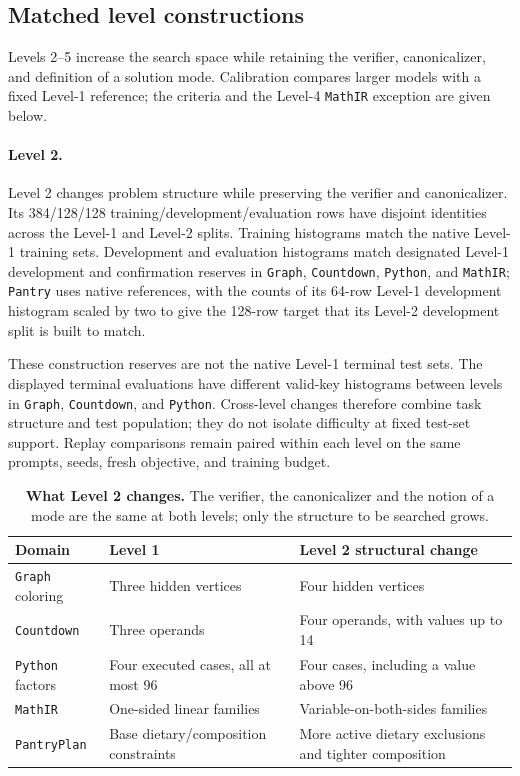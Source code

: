 \documentclass{article}
\newcommand{\1}{\mathbf 1}
\theoremstyle{remark}
\theoremstyle{definition}
\theoremstyle{plain}
\begin{document}
\subsection{Matched level constructions}
\label{app:data-levels}

Levels 2--5 increase the search space while retaining the verifier,
canonicalizer, and definition of a solution mode. Calibration compares larger
models with a fixed Level-1 reference; the criteria and the Level-4 \texttt{MathIR}
exception are given below.

\paragraph{Level 2.}
Level 2 changes problem structure while preserving the verifier and
canonicalizer. Its 384/128/128 training/development/evaluation rows have
disjoint identities across the Level-1 and Level-2 splits. Training histograms
match the native Level-1 training sets. Development and evaluation histograms
match designated Level-1 development and confirmation reserves in \texttt{Graph},
\texttt{Countdown}, \texttt{Python}, and \texttt{MathIR}; \texttt{Pantry} uses native references, with the counts
of its 64-row Level-1 development histogram scaled by two to give the 128-row
target that its Level-2 development split is built to match.

These construction reserves are not the native Level-1 terminal test sets.
The displayed terminal evaluations have different valid-key histograms
between levels in \texttt{Graph}, \texttt{Countdown}, and \texttt{Python}. Cross-level changes therefore
combine task structure and test population; they do not isolate difficulty
at fixed test-set support. Replay comparisons remain paired within each
level on the same prompts, seeds, fresh objective, and training budget.

\begin{table}[!htbp]
\centering
\caption{\textbf{What Level 2 changes.} The verifier, the canonicalizer and the
notion of a mode are the same at both levels; only the structure to be searched
grows.}
\label{tab:level2-structure}
\small
\begin{tabularx}{.96\linewidth}{@{}lYY@{}}
\toprule
\textbf{Domain} & \textbf{Level 1} & \textbf{Level 2 structural change} \\
\midrule
\texttt{Graph} coloring & Three hidden vertices & Four hidden vertices \\
\texttt{Countdown} & Three operands & Four operands, with values up to 14 \\
\texttt{Python} factors & Four executed cases, all at most 96 & Four cases, including a value above 96 \\
\texttt{MathIR} & One-sided linear families & Variable-on-both-sides families \\
\texttt{PantryPlan} & Base dietary/composition constraints & More active dietary exclusions and tighter composition \\
\bottomrule
\end{tabularx}
\end{table}
\end{document}

